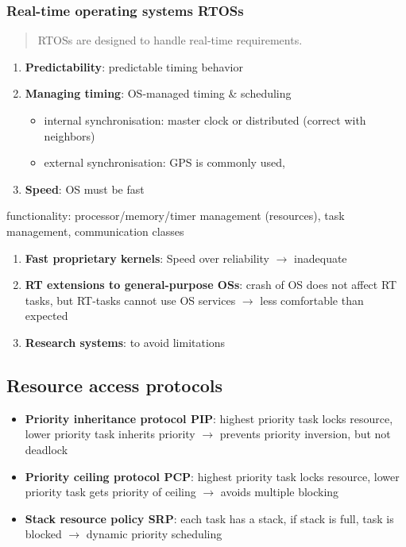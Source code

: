 \documentclass{article}
\begin{document}
\subsubsection{Real-time operating systems RTOSs}
\begin{quote}RTOSs are designed to handle real-time requirements.\end{quote}

\begin{enumerate}
  \item \textbf{Predictability}: predictable timing behavior
  \item \textbf{Managing timing}: OS-managed timing \& scheduling
        \begin{itemize}
          \item internal synchronisation: master clock or distributed (correct with neighbors)
          \item external synchronisation: GPS is commonly used,
        \end{itemize}
  \item \textbf{Speed}: OS must be fast
\end{enumerate}

functionality: processor/memory/timer management (resources), task management, communication
classes
\begin{enumerate}
  \item \textbf{Fast proprietary kernels}: Speed over reliability $\to$ inadequate
  \item \textbf{RT extensions to general-purpose OSs}: crash of OS does not affect RT tasks, but RT-tasks cannot use OS services $\to$ less comfortable than expected
  \item \textbf{Research systems}: to avoid limitations
\end{enumerate}

\subsection{Resource access protocols}
\begin{itemize}
  \item \textbf{Priority inheritance protocol PIP}: highest priority task locks resource, lower priority task inherits priority $\to$ prevents priority inversion, but not deadlock
  \item \textbf{Priority ceiling protocol PCP}: highest priority task locks resource, lower priority task gets priority of ceiling $\to$ avoids multiple blocking
  \item \textbf{Stack resource policy SRP}: each task has a stack, if stack is full, task is blocked $\to$ dynamic priority scheduling
\end{itemize}
\end{document}

